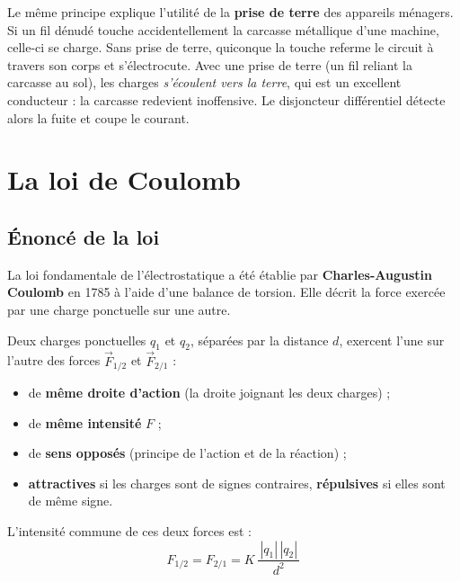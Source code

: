 \documentclass[11pt,a4paper]{article}
\newcommand{\vc}[1]{\vec{#1}}
\newcommand{\F}[2]{\vc{F}_{#1/#2}}     %
\begin{document}
\begin{remarque}
Le même principe explique l'utilité de la \textbf{prise de terre} des appareils ménagers. Si un fil
dénudé touche accidentellement la carcasse métallique d'une machine, celle-ci se charge. Sans prise
de terre, quiconque la touche referme le circuit à travers son corps et s'électrocute. Avec une
prise de terre (un fil reliant la carcasse au sol), les charges \emph{s'écoulent vers la terre},
qui est un excellent conducteur : la carcasse redevient inoffensive. Le disjoncteur différentiel
détecte alors la fuite et coupe le courant.
\end{remarque}

\section{La loi de Coulomb}

\subsection{Énoncé de la loi}

La loi fondamentale de l'électrostatique a été établie par \textbf{Charles-Augustin Coulomb} en
1785 à l'aide d'une balance de torsion. Elle décrit la force exercée par une charge ponctuelle sur
une autre.

\begin{theoreme}
Deux charges ponctuelles $q_1$ et $q_2$, séparées par la distance $d$, exercent l'une sur l'autre
des forces $\F{1}{2}$ et $\F{2}{1}$ :
\begin{itemize}[leftmargin=1.6em,topsep=2pt,itemsep=1pt]
  \item de \textbf{même droite d'action} (la droite joignant les deux charges) ;
  \item de \textbf{même intensité} $F$ ;
  \item de \textbf{sens opposés} (principe de l'action et de la réaction) ;
  \item \textbf{attractives} si les charges sont de signes contraires, \textbf{répulsives} si elles
        sont de même signe.
\end{itemize}
L'intensité commune de ces deux forces est :
\[ \boxed{\,F_{1/2} = F_{2/1} = K\,\dfrac{\,|q_1|\,|q_2|\,}{d^{2}}\,} \]
\end{theoreme}
\end{document}
